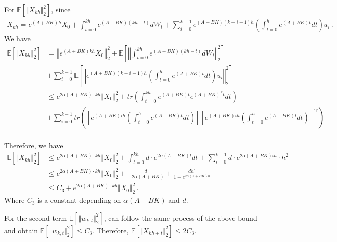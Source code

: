 \documentclass{article}
\theoremstyle{definition}
\begin{document}
For $\mathbb{E}\left[\Vert X_{kh}\Vert_{2}^{2}\right]$, since 
\begin{align*}
X_{kh}=e^{(A+BK)h}X_{0}+\int_{t=0}^{kh}e^{(A+BK)(kh-t)}dW_{t}+\sum_{i=0}^{k-1}e^{(A+BK)(k-i-1)h}\left(\int_{t=0}^{h}e^{(A+BK)t}dt\right)u_{i}\,.
\end{align*}
We have
\begin{align*}
\mathbb{E}\left[\Vert X_{kh}\Vert^{2}_{2}  \right]&=\left\Vert e^{(A+BK)kh}X_{0}\right\Vert^{2}_{2}+\mathbb{E}\left[\left\Vert \int_{t=0}^{kh}e^{(A+BK)(kh-t)}dW_{t}  \right\Vert^{2}_{2}\right] \\ &+\sum_{i=0}^{k-1}\mathbb{E}\left[\left\Vert e^{(A+BK)(k-i-1)h}\left(\int_{t=0}^{h}e^{(A+BK)t}dt\right)u_{i} \right\Vert^{2}_{2}\right] \\
&\leq e^{2\alpha(A+BK)\cdot kh}\Vert X_{0}\Vert^{2}_{2}+tr\left(\int_{t=0}^{kh}e^{(A+BK)t}e^{(A+BK)^{\mathrm{T}}t}dt\right)\\
&+\sum_{i=0}^{k-1}tr\left(\left[e^{(A+BK)ih}\left(\int_{t=0}^{h}e^{(A+BK)t}dt\right)\right]\left[e^{(A+BK)ih}\left(\int_{t=0}^{h}e^{(A+BK)t}dt\right)\right]^{\mathrm{T}}\right)\\
\end{align*}

Therefore, we have
\begin{align*}
\mathbb{E}\left[\Vert X_{kh}\Vert^{2}_{2}  \right]
&\leq e^{2\alpha(A+BK)\cdot kh}\Vert X_{0}\Vert^{2}_{2}+\int_{t=0}^{kh}d\cdot e^{2\alpha(A+BK)t}dt+\sum_{i=0}^{k-1}d\cdot e^{2\alpha(A+BK)ih}\cdot h^{2}\\
&\leq e^{2\alpha(A+BK)\cdot kh}\Vert X_{0}\Vert^{2}_{2}+\frac{d}{-2\alpha(A+BK)}+\frac{dh^{2}}{1-e^{2\alpha(A+BK)h}}\\
&\leq C_{3}+e^{2\alpha(A+BK)\cdot kh}\Vert X_{0}\Vert^{2}_{2}\,.
\end{align*}
Where $C_{3}$ is a constant depending on $\alpha(A+BK)$ and $d$.

For the second term $\mathbb{E}\left[\Vert w_{k,t}\Vert^{2}_{2}\right]$, can follow the same process of the above bound and obtain $\mathbb{E}\left[\Vert w_{k,t}\Vert^{2}_{2}\right]\leq C_{3}$.
Therefore, $\mathbb{E}\left[\Vert X_{kh+t}\Vert^{2}_{2}\right]\leq 2C_{3}$.
\end{document}
